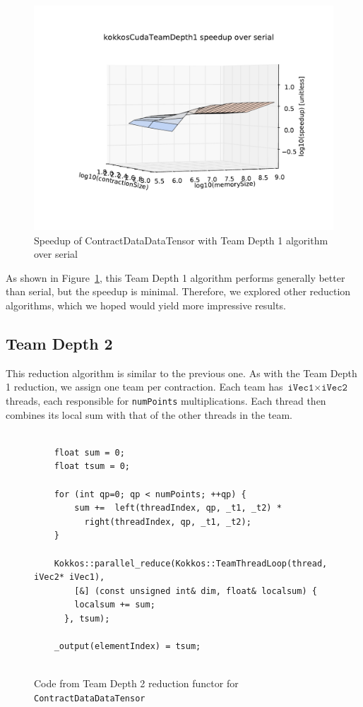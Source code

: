 \begin{figure}[ht]
    \includegraphics[scale=.55]{./VersusSerial_kokkosCudaTeamDepth1_clearCache_shadowfax.pdf}
\caption{Speedup of ContractDataDataTensor with Team Depth 1 algorithm over
    serial
\label{fig:ContractDataDataTensorDepth1}} 
\end{figure}

As shown in Figure~\ref{fig:ContractDataDataTensorDepth1}, this Team Depth 1
algorithm performs generally better than serial, but the speedup is minimal.
Therefore, we explored other reduction algorithms, which we hoped would yield
more impressive results.

\subsection{Team Depth 2}
    This reduction algorithm is similar to the previous one.  As with the Team
    Depth 1 reduction, we assign one team per contraction.  Each team has
    $\texttt{iVec1} \times \texttt{iVec2}$ threads, each responsible for
    \texttt{numPoints} multiplications.  Each thread then combines its local sum
    with that of the other threads in the team.

\begin{figure}[ht]
    \begin{lstlisting}

    float sum = 0;
    float tsum = 0;

    for (int qp=0; qp < numPoints; ++qp) {
        sum +=  left(threadIndex, qp, _t1, _t2) *
          right(threadIndex, qp, _t1, _t2);
    }

    Kokkos::parallel_reduce(Kokkos::TeamThreadLoop(thread, iVec2* iVec1),
        [&] (const unsigned int& dim, float& localsum) {
        localsum += sum;
      }, tsum);

    _output(elementIndex) = tsum;
    
 \end{lstlisting}
\caption{Code from Team Depth 2 reduction functor for \texttt{ContractDataDataTensor}
\label{lst:ContractDataDataTensorDepth2Functor}} 
\end{figure}

